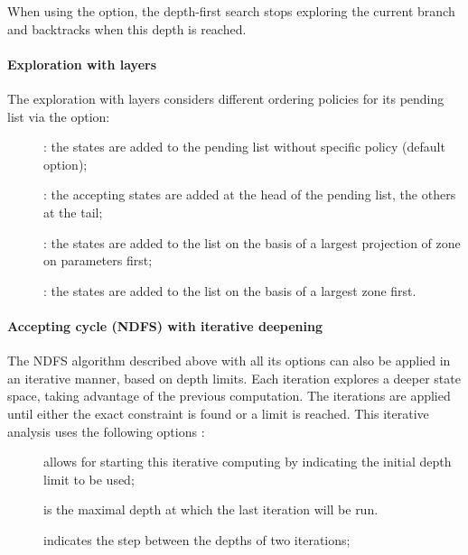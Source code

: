 When using the  option, the depth-first search stops exploring
the current branch and backtracks when this depth is reached.


\paragraph{Exploration with layers}
The exploration with layers considers different ordering policies for its pending
list via the  option:
\begin{description}
	\item[]: the states are added to the pending list
	      without specific policy	(default option);
	\item[]: the accepting states are added at
	      the head of the pending list, the others at the tail;
	\item[]: the states are added to the list on
	      the basis of a largest projection of zone on parameters first;
	\item[]: the states are added to the list on
	      the basis of a largest zone first.
\end{description}



\paragraph{Accepting cycle (NDFS) with iterative deepening}\label{sss:accepting-loop-NDFS-iterative}

The NDFS algorithm described above with all its options
can also be applied
in an iterative manner, based on depth limits. Each iteration explores a deeper state
space, taking advantage of the previous computation. The iterations are applied until
either the exact constraint is found or a limit is reached. This iterative analysis
uses the following options :

\begin{description}
	\item[] allows for starting this iterative computing by indicating
	      the initial depth limit to be used;
	\item[] is the maximal depth at which the last iteration
	      will be run.
	\item[] indicates the step between the depths of two iterations;
\end{description}

